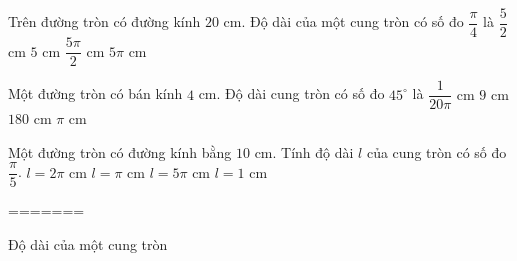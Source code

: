 \begin{ex}%
	Trên đường tròn có đường kính $20$ cm. Độ dài của một cung tròn có số đo $\dfrac{\pi}{4}$ là
	\choice
	{$\dfrac{5}{2}$ cm}
	{$5$ cm}
	{\True $\dfrac{5\pi}{2}$ cm}
	{$5\pi$ cm}
\end{ex}

\begin{ex}%
	Một đường tròn có bán kính $4 $ cm. Độ dài cung tròn có số đo $45^{\circ}$ là
	\choice
	{$\dfrac{1}{20 \pi} $ cm}
	{$9 $ cm}
	{$180 $ cm}
	{\True $\pi $ cm}
\end{ex}

\begin{ex}%
	Một đường tròn có đường kính bằng $10 \text{ cm}$. Tính độ dài $l$ của cung tròn có số đo $\dfrac{\pi}{5}$.
	\choice
	{\True $l=2 \pi\text{ cm}$}
	{$l=\pi\text{ cm}$}
	{$l=5 \pi\text{ cm}$}
	{$l=1\text{ cm}$}
\end{ex}

=======


\begin{dang}{Độ dài của một cung tròn}
	
\end{dang}

